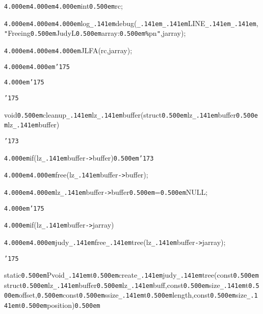 \noindent
{}{\tt\mc \kern4.000em}{\tt\mc \kern4.000em}{\tt\mc \kern4.000em}int{\tt\mc \kern0.500em}rc;

\noindent
{}{\tt\mc \kern4.000em}{\tt\mc \kern4.000em}{\tt\mc \kern4.000em}log{\tt\_\kern.141em}debug({\tt\_\kern.141em}{\tt\_\kern.141em}LINE{\tt\_\kern.141em}{\tt\_\kern.141em},{\tt "}Freeing{\tt\mc \kern0.500em}JudyL{\tt\mc \kern0.500em}array:{\tt\mc \kern0.500em}{\tt\%}p{\tt{}}n{\tt "},jarray);

\noindent
{}{\tt\mc \kern4.000em}{\tt\mc \kern4.000em}{\tt\mc \kern4.000em}JLFA(rc,jarray);

\noindent
{}{\tt\mc \kern4.000em}{\tt\mc \kern4.000em}{\tt\char'175}

\noindent
{}{\tt\mc \kern4.000em}{\tt\char'175}

\noindent
{}{\tt\char'175}

\noindent
{}\hfill

\noindent
{}void{\tt\mc \kern0.500em}cleanup{\tt\_\kern.141em}lz{\tt\_\kern.141em}buffer(struct{\tt\mc \kern0.500em}lz{\tt\_\kern.141em}buffer{\tt *}{\tt\mc \kern0.500em}lz{\tt\_\kern.141em}buffer)

\noindent
{}{\tt\char'173}

\noindent
{}{\tt\mc \kern4.000em}if(lz{\tt\_\kern.141em}buffer{\tt -}{\tt >}buffer){\tt\mc \kern0.500em}{\tt\char'173}

\noindent
{}{\tt\mc \kern4.000em}{\tt\mc \kern4.000em}free(lz{\tt\_\kern.141em}buffer{\tt -}{\tt >}buffer);

\noindent
{}{\tt\mc \kern4.000em}{\tt\mc \kern4.000em}lz{\tt\_\kern.141em}buffer{\tt -}{\tt >}buffer{\tt\mc \kern0.500em}={\tt\mc \kern0.500em}NULL;

\noindent
{}{\tt\mc \kern4.000em}{\tt\char'175}

\noindent
{}{\tt\mc \kern4.000em}if(lz{\tt\_\kern.141em}buffer{\tt -}{\tt >}jarray)

\noindent
{}{\tt\mc \kern4.000em}{\tt\mc \kern4.000em}judy{\tt\_\kern.141em}free{\tt\_\kern.141em}tree(lz{\tt\_\kern.141em}buffer{\tt -}{\tt >}jarray);

\noindent
{}{\tt\char'175}

\noindent
{}\hfill

\noindent
{}static{\tt\mc \kern0.500em}Pvoid{\tt\_\kern.141em}t{\tt\mc \kern0.500em}create{\tt\_\kern.141em}judy{\tt\_\kern.141em}tree(const{\tt\mc \kern0.500em}struct{\tt\mc \kern0.500em}lz{\tt\_\kern.141em}buffer{\tt *}{\tt\mc \kern0.500em}lz{\tt\_\kern.141em}buff,const{\tt\mc \kern0.500em}size{\tt\_\kern.141em}t{\tt\mc \kern0.500em}offset,{\tt\mc \kern0.500em}const{\tt\mc \kern0.500em}ssize{\tt\_\kern.141em}t{\tt\mc \kern0.500em}length,const{\tt\mc \kern0.500em}size{\tt\_\kern.141em}t{\tt\mc \kern0.500em}position){\tt\mc \kern0.500em}

